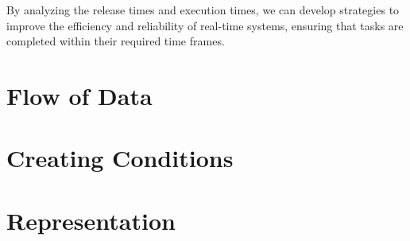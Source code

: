 By analyzing the release times and execution times, we can develop strategies to improve the efficiency and reliability of real-time systems, ensuring that tasks are completed within their required time frames.

\section{Flow of Data}
\label{sec:flow_of_data}

\section{Creating Conditions}
\label{sec:creating_conditions}

\section{Representation}
\label{sec:representation}